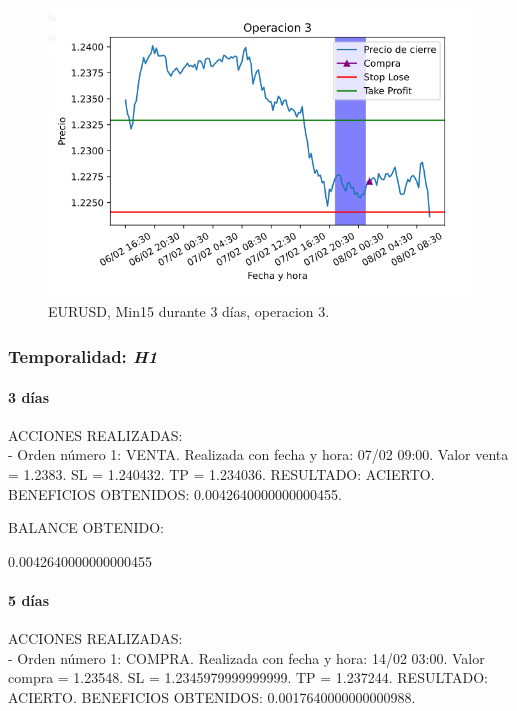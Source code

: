 \begin{figure}[h]
	\includegraphics[width=1\textwidth]{imagenes/pruebas/EURUSD/min15_3dias_3.png}	
	\caption{EURUSD, Min15 durante 3 días, operacion 3.}
\end{figure}


\subsubsection{Temporalidad: \textit{H1}}

\paragraph{3 días}

ACCIONES REALIZADAS:\\

- Orden número 1: VENTA. Realizada con fecha y hora: 07/02 09:00. Valor venta = 1.2383. SL = 1.240432. TP = 1.234036. RESULTADO: ACIERTO. BENEFICIOS OBTENIDOS: 0.0042640000000000455.\newline

\color{blue}
BALANCE OBTENIDO:\newline

0.0042640000000000455\newline
\color{black}
\paragraph{5 días}

ACCIONES REALIZADAS:\\

- Orden número 1: COMPRA. Realizada con fecha y hora: 14/02 03:00. Valor compra = 1.23548. SL = 1.2345979999999999. TP = 1.237244. RESULTADO: ACIERTO. BENEFICIOS OBTENIDOS: 0.0017640000000000988.\newline


